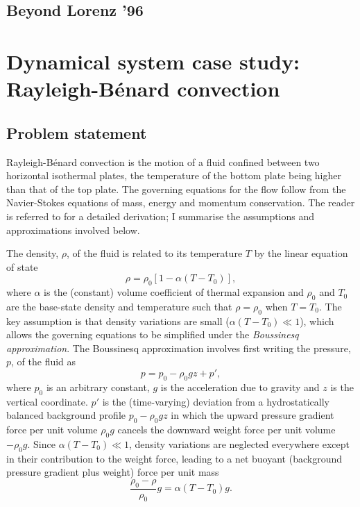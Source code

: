 \documentclass[titlepage,twoside]{article}
\numberwithin{equation}{section}
\newcommand{\rb}{Rayleigh-B\'{e}nard}
\begin{document}
\subsection{Beyond Lorenz '96}


\clearpage
\section{Dynamical system case study: \rb{} convection}
\subsection{Problem statement}
\rb{} convection is the motion of a fluid confined between two
horizontal isothermal plates, the temperature of the bottom plate being
higher than that of the top plate. The governing equations for the flow
follow from the Navier-Stokes equations of mass, energy and momentum
conservation. The reader is referred to \textcite{chandrasekhar1961} for
a detailed derivation; I summarise the assumptions and approximations
involved below.

The density, $\rho$, of the fluid is related to its temperature $T$ by
the linear equation of state
\[
    \rho = \rho_0 [1 - \alpha(T - T_0)],
\]
where $\alpha$ is the (constant) volume coefficient of thermal expansion and
$\rho_0$ and $T_0$ are the base-state density and temperature such that $\rho =
\rho_0$ when $T = T_0$. The key assumption is that density variations are small
($\alpha (T - T_0) \ll 1$), which allows the governing equations to be
simplified under the \emph{Boussinesq approximation}. The Boussinesq
approximation involves first writing the pressure, $p$, of the fluid as
\[
    p = p_0 - \rho_0 gz + p',
\]
where $p_0$ is an arbitrary constant, $g$ is the acceleration due to gravity
and $z$ is the vertical coordinate. $p'$ is the (time-varying) deviation from
a hydrostatically balanced background profile $p_0 - \rho_0 gz$
in which the upward pressure gradient force per unit volume $\rho_0 g$ cancels
the downward weight force per unit volume $-\rho_0 g$. Since
$\alpha (T - T_0) \ll 1$, density variations are neglected everywhere except
in their contribution to the weight force, leading to a net buoyant
(background pressure gradient plus weight) force per unit mass
\[
    \frac{\rho_0 - \rho}{\rho_0} g = \alpha (T - T_0) g.
\]
\end{document}
